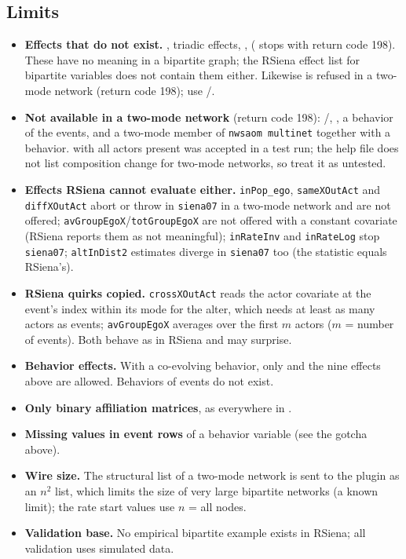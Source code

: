 \subsection{Limits}\label{sec:twomode-limits}

\begin{itemize}
\item \textbf{Effects that do not exist.} , triadic effects, ,  ( stops with return code 198). These have no meaning in a bipartite graph; the RSiena effect list for bipartite variables does not contain them either. Likewise  is refused in a two-mode network (return code 198); use /.
\item \textbf{Not available in a two-mode network} (return code 198): /, , a behavior of the events, and a two-mode member of \texttt{nwsaom multinet} together with a behavior.  with all actors present was accepted in a test run; the help file does not list composition change for two-mode networks, so treat it as untested.
\item \textbf{Effects RSiena cannot evaluate either.} \texttt{inPop\_ego}, \texttt{sameXOutAct} and \texttt{diffXOutAct} abort or throw in \texttt{siena07} in a two-mode network and are not offered; \texttt{avGroupEgoX}/\texttt{totGroupEgoX} are not offered with a constant covariate (RSiena reports them as not meaningful); \texttt{inRateInv} and \texttt{inRateLog} stop \texttt{siena07}; \texttt{altInDist2} estimates diverge in \texttt{siena07} too (the statistic equals RSiena's).
\item \textbf{RSiena quirks copied.} \texttt{crossXOutAct} reads the actor covariate at the event's index within its mode for the alter, which needs at least as many actors as events; \texttt{avGroupEgoX} averages over the first $m$ actors ($m$ = number of events). Both behave as in RSiena and may surprise.
\item \textbf{Behavior effects.} With a co-evolving behavior, only  and the nine  effects above are allowed. Behaviors of events do not exist.
\item \textbf{Only binary affiliation matrices}, as everywhere in \nwsaom{}.
\item \textbf{Missing values in event rows} of a behavior variable (see the gotcha above).
\item \textbf{Wire size.} The structural list of a two-mode network is sent to the plugin as an $n^2$ list, which limits the size of very large bipartite networks (a known limit); the rate start values use $n$ = all nodes.
\item \textbf{Validation base.} No empirical bipartite example exists in RSiena; all validation uses simulated data.
\end{itemize}

